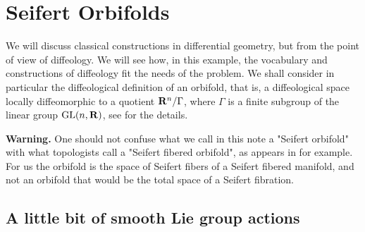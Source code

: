 
\chapter*{\sf Seifert Orbifolds}
\setcounter{footnote}{0}


\begin{abstract}
  The quotient of a $3$-manifold by an effective action of $\Sph^1$,
  without fixed points,
  is a classical example of an orbifold.
  But how does this fit within the diffeological framework?%
\end{abstract}


We will discuss classical constructions in differential geometry,
but from the point of view of diffeology.
We will see how,
in this example,
the vocabulary and constructions of diffeology fit the needs of the problem.
We shall consider in particular the diffeological definition of an orbifold,
that is,
a diffeological space locally diffeomorphic to a quotient $\mathbf{R}^n/\Gamma$,
where $\Gamma$ is a finite subgroup of the linear group $\mathrm{GL}(n,\mathbf{R})$,
see \cite{IKZ10} for the details.

\textbf{Warning.} One should not confuse what we call in this note a "Seifert orbifold" with what topologists call a "Seifert fibered orbifold",
as appears in \cite{BoSi85} for example.
For us the orbifold is the space of Seifert fibers of a Seifert fibered manifold,
and not an orbifold that would be the total space of a Seifert fibration.


\section{A little bit of smooth Lie group actions}

